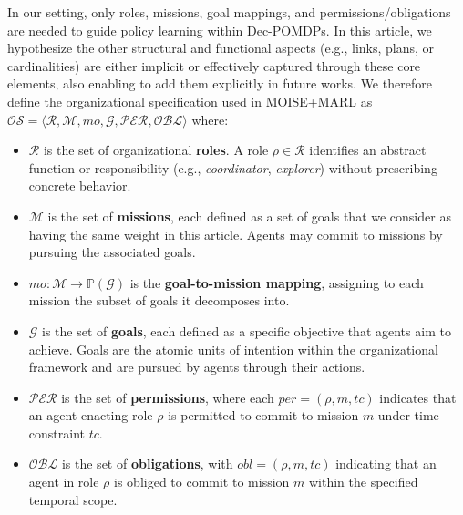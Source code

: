 \documentclass[pdflatex,sn-mathphys-num]{sn-jnl}%
\theoremstyle{thmstyleone}%
\theoremstyle{thmstyletwo}%
\theoremstyle{thmstylethree}%
\begin{document}
\noindent In our setting, only roles, missions, goal mappings, and permissions/obligations are needed to guide policy learning within Dec-POMDPs. In this article, we hypothesize the other structural and functional aspects (e.g., links, plans, or cardinalities) are either implicit or effectively captured through these core elements, also enabling to add them explicitly in future works. We therefore define the organizational specification used in MOISE+MARL as $\mathcal{OS} = \langle \mathcal{R}, \mathcal{M}, mo, \mathcal{G}, \mathcal{PER}, \mathcal{OBL} \rangle$ where:
\begin{itemize}
    \item $\mathcal{R}$ is the set of organizational \textbf{roles}.
          A role $\rho \in \mathcal{R}$ identifies an abstract function or responsibility 
          (e.g., \textit{coordinator}, \textit{explorer}) without prescribing concrete behavior.
          
    \item $\mathcal{M}$ is the set of \textbf{missions}, each defined as a
          set of goals that we consider as having the same weight in this article. Agents may commit to missions by pursuing the associated goals.
          
    \item $mo: \mathcal{M} \rightarrow \mathbb{P}(\mathcal{G})$ is the
          \textbf{goal-to-mission mapping}, assigning to each mission the subset 
          of goals it decomposes into.
          
    \item $\mathcal{G}$ is the set of \textbf{goals}, each defined as a
          specific objective that agents aim to achieve. Goals are the atomic units of 
          intention within the organizational framework and are pursued by agents 
          through their actions.
          
    \item $\mathcal{PER}$ is the set of \textbf{permissions}, where each
          $per = (\rho, m, tc)$ indicates that an agent enacting role $\rho$
          is permitted to commit to mission $m$ under time constraint $tc$.
          
    \item $\mathcal{OBL}$ is the set of \textbf{obligations},
          with $obl = (\rho, m, tc)$ indicating that an agent in role $\rho$
          is obliged to commit to mission $m$ within the specified temporal scope.
          
\end{itemize}
\end{document}

